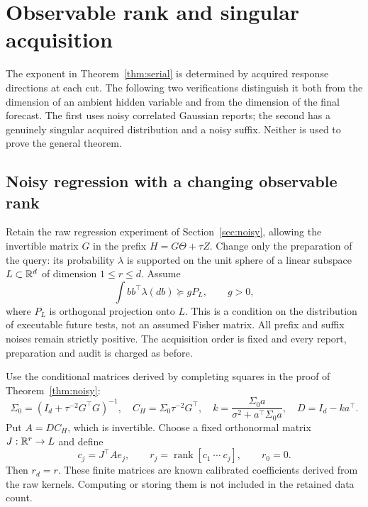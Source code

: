 \section{Observable rank and singular acquisition}\label{sec:rank-singu}
The exponent in Theorem~\ref{thm:serial} is determined by acquired response directions at each cut. The following two verifications distinguish it both from the dimension of an ambient hidden variable and from the dimension of the final forecast. The first uses noisy correlated Gaussian reports; the second has a genuinely singular acquired distribution and a noisy suffix. Neither is used to prove the general theorem.

\subsection{Noisy regression with a changing observable rank}
Retain the raw regression experiment of Section~\ref{sec:noisy}, allowing the invertible matrix $G$ in the prefix $H=G\Theta+\tau Z$. Change only the preparation of the query: its probability $\lambda$ is supported on the unit sphere of a linear subspace $L\subset\mathbb R^d$ of dimension $1\le r\le d$. Assume
\begin{equation}\label{eq:rankframe}
 \int bb^\top\lambda(db)\succeq gP_L,\qquad g>0,
\end{equation}
where $P_L$ is orthogonal projection onto $L$. This is a condition on the distribution of executable future tests, not an assumed Fisher matrix. All prefix and suffix noises remain strictly positive. The acquisition order is fixed and every report, preparation and audit is charged as before.

Use the conditional matrices derived by completing squares in the proof of Theorem~\ref{thm:noisy}:
\[
 \Sigma_0=(I_d+\tau^{-2}G^\top G)^{-1},\quad
 C_H=\Sigma_0\tau^{-2}G^\top,\quad
 k=\frac{\Sigma_0a}{\sigma^2+a^\top\Sigma_0a},\quad D=I_d-ka^\top.
\]
Put $A=DC_H$, which is invertible. Choose a fixed orthonormal matrix $J:\mathbb R^r\to L$ and define
\[
 c_j=J^\top A e_j,\qquad r_j=\operatorname{rank}[c_1\ \cdots\ c_j],
 \qquad r_0=0.
\]
Then $r_d=r$. These finite matrices are known calibrated coefficients derived from the raw kernels. Computing or storing them is not included in the retained data count.

